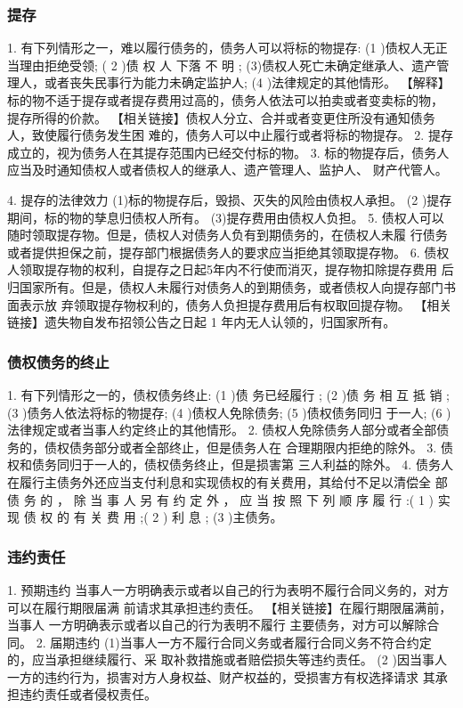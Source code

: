 \documentclass[UTF8,12pt]{ctexart}
\numberwithin{equation}{section} %
\numberwithin{figure}{section}
\numberwithin{table}{section}
\begin{document}
	
	
	\subsubsection{提存}
	1. 有下列情形之一，难以履行债务的，债务人可以将标的物提存:
	(1 )债权人无正当理由拒绝受领;
	( 2 )债 权 人 下落 不 明 ; (3)债权人死亡未确定继承人、遗产管理人，或者丧失民事行为能力未确定监护人; (4 )法律规定的其他情形。
	【解释】标的物不适于提存或者提存费用过高的，债务人依法可以拍卖或者变卖标的物， 提存所得的价款。
	【相关链接】债权人分立、合并或者变更住所没有通知债务人，致使履行债务发生困 难的，债务人可以中止履行或者将标的物提存。
	2. 提存成立的，视为债务人在其提存范围内已经交付标的物。
	3. 标的物提存后，债务人应当及时通知债权人或者债权人的继承人、遗产管理人、监护人、 财产代管人。
	
	4. 提存的法律效力
	(1)标的物提存后，毁损、灭失的风险由债权人承担。
	(2 )提存期间，标的物的孳息归债权人所有。
	(3)提存费用由债权人负担。
	5. 债权人可以随时领取提存物。但是，债权人对债务人负有到期债务的，在债权人未履 行债务或者提供担保之前，提存部门根据债务人的要求应当拒绝其领取提存物。
	6. 债权人领取提存物的权利，自提存之日起5年内不行使而消灭，提存物扣除提存费用 后归国家所有。但是，债权人未履行对债务人的到期债务，或者债权人向提存部门书面表示放 弃领取提存物权利的，债务人负担提存费用后有权取回提存物。 【相关链接】遗失物自发布招领公告之日起 1 年内无人认领的，归国家所有。
	
	\subsubsection{债权债务的终止}
	1. 有下列情形之一的，债权债务终止:
	(1 )债 务已经履行 ;
	(2 )债 务 相 互 抵 销 ;
	(3 )债务人依法将标的物提存;
	(4 )债权人免除债务;
	(5 )债权债务同归 于一人;
	(6 )法律规定或者当事人约定终止的其他情形。
	2. 债权人免除债务人部分或者全部债务的，债权债务部分或者全部终止，但是债务人在 合理期限内拒绝的除外。
	3. 债权和债务同归于一人的，债权债务终止，但是损害第 三人利益的除外。
	4. 债务人在履行主债务外还应当支付利息和实现债权的有关费用，其给付不足以清偿全 部 债 务 的 ， 除 当 事 人 另 有 约 定 外 ， 应 当 按 照 下 列 顺 序 履 行 :( 1 ) 实 现 债 权 的 有 关 费 用 ;( 2 ) 利 息 ; (3 )主债务。
	
	\subsubsection{违约责任}
	
	1. 预期违约 当事人一方明确表示或者以自己的行为表明不履行合同义务的，对方可以在履行期限届满 前请求其承担违约责任。
	【相关链接】在履行期限届满前，当事人 一方明确表示或者以自己的行为表明不履行 主要债务，对方可以解除合同。
	2. 届期违约 (1)当事人一方不履行合同义务或者履行合同义务不符合约定的，应当承担继续履行、采 取补救措施或者赔偿损失等违约责任。
	(2 )因当事人 一方的违约行为，损害对方人身权益、财产权益的，受损害方有权选择请求 其承担违约责任或者侵权责任。
	
\end{document}
